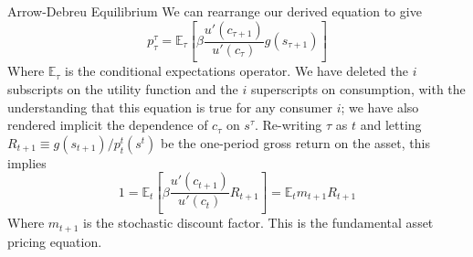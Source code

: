 \documentclass[aspectratio=169,xcolor=dvipsnames]{beamer}
\begin{document}
\begin{frame}{Arrow-Debreu Equilibrium}
    We can rearrange our derived equation to give
    \[
        p^\tau_\tau = \mathbb{E}_\tau \left[ \beta \frac{u'(c_{\tau+1})}{u'(c_\tau)} g(s_{\tau+1})\right]
    \]
    Where $\mathbb{E}_\tau$ is the conditional expectations operator. We have deleted the $i$ subscripts on the utility function and the $i$ superscripts on consumption, with the understanding that this equation is true for any consumer $i$; we have also rendered implicit the dependence of $c_\tau$ on $s^\tau$. Re-writing $\tau$ as $t$ and letting $R_{t+1} \equiv g(s_{t+1})/p^t_t(s^t)$ be the one-period gross return on the asset, this implies
    \[
        1 = \mathbb{E}_t \left[ \beta \frac{u'(c_{t+1})}{u'(c_t)} R_{t+1}\right] = \mathbb{E}_t m_{t+1} R_{t+1}
    \]
    Where $m_{t+1}$ is the stochastic discount factor. This is the fundamental asset pricing equation.
\end{frame}
\end{document}
